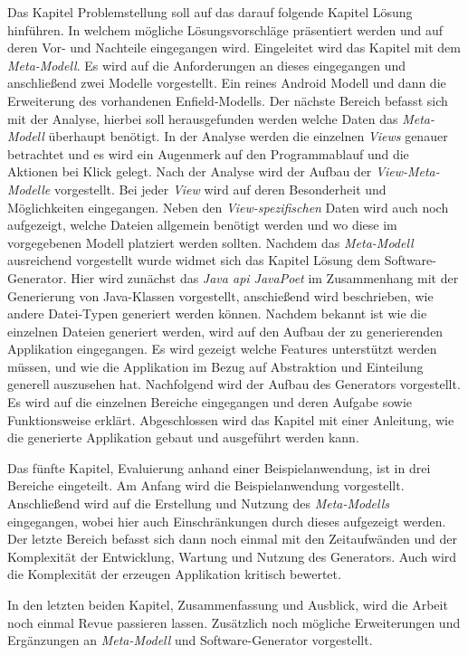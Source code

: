 Das Kapitel Problemstellung soll auf das darauf folgende Kapitel Lösung hinführen. In welchem mögliche Lösungsvorschläge präsentiert werden und auf deren Vor- und Nachteile eingegangen wird. Eingeleitet wird das Kapitel mit dem \textit{Meta-Modell}. Es wird auf die Anforderungen an dieses eingegangen und anschließend zwei Modelle vorgestellt. Ein reines Android Modell und dann die Erweiterung des vorhandenen Enfield-Modells. Der nächste Bereich befasst sich mit der Analyse, hierbei soll herausgefunden werden welche Daten das \textit{Meta-Modell} überhaupt benötigt. In der Analyse werden die einzelnen \textit{Views} genauer betrachtet und es wird ein Augenmerk auf den Programmablauf und die Aktionen bei Klick gelegt. Nach der Analyse wird der Aufbau der \textit{View-Meta-Modelle} vorgestellt. Bei jeder \textit{View} wird auf deren Besonderheit und Möglichkeiten eingegangen. Neben den \textit{View-spezifischen} Daten wird auch noch aufgezeigt, welche Dateien allgemein benötigt werden und wo diese im vorgegebenen Modell platziert werden sollten. Nachdem das \textit{Meta-Modell} ausreichend vorgestellt wurde widmet sich das Kapitel Lösung dem Software-Generator. Hier wird zunächst das \textit{Java \acf{api} JavaPoet} im Zusammenhang mit der Generierung von Java-Klassen vorgestellt, anschießend wird beschrieben, wie andere Datei-Typen generiert werden können. Nachdem bekannt ist wie die einzelnen Dateien generiert werden, wird auf den Aufbau der zu generierenden Applikation eingegangen. Es wird gezeigt welche Features unterstützt werden müssen, und wie die Applikation im Bezug auf Abstraktion und Einteilung generell auszusehen hat. Nachfolgend wird der Aufbau des Generators vorgestellt. Es wird auf die einzelnen Bereiche eingegangen und deren Aufgabe sowie Funktionsweise erklärt. Abgeschlossen wird das Kapitel mit einer Anleitung, wie die generierte Applikation gebaut und ausgeführt werden kann.

Das fünfte Kapitel, Evaluierung anhand einer Beispielanwendung, ist in drei Bereiche eingeteilt. Am Anfang wird die Beispielanwendung vorgestellt. Anschließend wird auf die Erstellung und Nutzung des \textit{Meta-Modells} eingegangen, wobei hier auch Einschränkungen durch dieses aufgezeigt werden. Der letzte Bereich befasst sich dann noch einmal mit den Zeitaufwänden und der Komplexität der Entwicklung, Wartung und Nutzung des Generators. Auch wird die Komplexität der erzeugen Applikation kritisch bewertet.

In den letzten beiden Kapitel, Zusammenfassung und Ausblick, wird die Arbeit noch einmal Revue passieren lassen. Zusätzlich noch mögliche Erweiterungen und Ergänzungen an \textit{Meta-Modell} und Software-Generator vorgestellt.